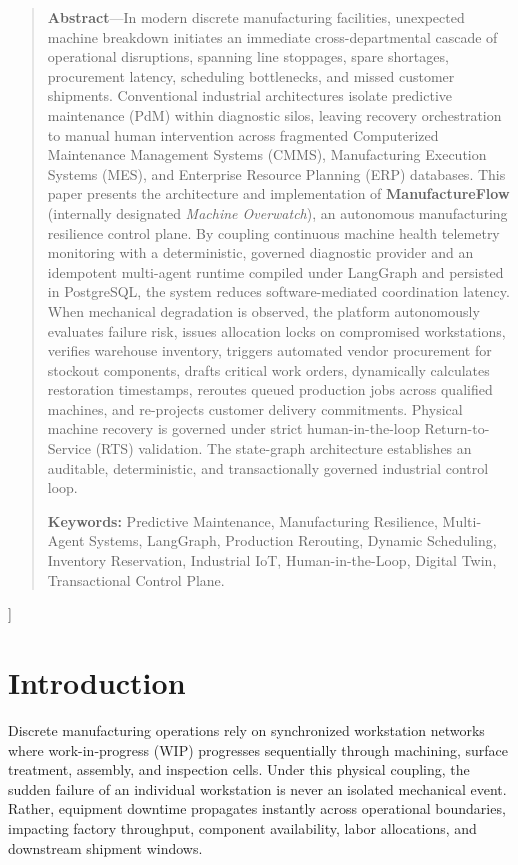 \documentclass[10pt,twocolumn,a4paper]{article}
\begin{document}
{\begin{quote}
  \small
  \textbf{Abstract}---In modern discrete manufacturing facilities, unexpected machine breakdown initiates an immediate cross-departmental cascade of operational disruptions, spanning line stoppages, spare shortages, procurement latency, scheduling bottlenecks, and missed customer shipments. Conventional industrial architectures isolate predictive maintenance (PdM) within diagnostic silos, leaving recovery orchestration to manual human intervention across fragmented Computerized Maintenance Management Systems (CMMS), Manufacturing Execution Systems (MES), and Enterprise Resource Planning (ERP) databases. This paper presents the architecture and implementation of \textbf{ManufactureFlow} (internally designated \textit{Machine Overwatch}), an autonomous manufacturing resilience control plane. By coupling continuous machine health telemetry monitoring with a deterministic, governed diagnostic provider and an idempotent multi-agent runtime compiled under LangGraph and persisted in PostgreSQL, the system reduces software-mediated coordination latency. When mechanical degradation is observed, the platform autonomously evaluates failure risk, issues allocation locks on compromised workstations, verifies warehouse inventory, triggers automated vendor procurement for stockout components, drafts critical work orders, dynamically calculates restoration timestamps, reroutes queued production jobs across qualified machines, and re-projects customer delivery commitments. Physical machine recovery is governed under strict human-in-the-loop Return-to-Service (RTS) validation. The state-graph architecture establishes an auditable, deterministic, and transactionally governed industrial control loop.
  \par\vspace{0.5em}
  \noindent\textbf{Keywords:} Predictive Maintenance, Manufacturing Resilience, Multi-Agent Systems, LangGraph, Production Rerouting, Dynamic Scheduling, Inventory Reservation, Industrial IoT, Human-in-the-Loop, Digital Twin, Transactional Control Plane.
\end{quote}
\vspace{1.2em}
}]

\section{Introduction}
\label{sec:introduction}
Discrete manufacturing operations rely on synchronized workstation networks where work-in-progress (WIP) progresses sequentially through machining, surface treatment, assembly, and inspection cells. Under this physical coupling, the sudden failure of an individual workstation is never an isolated mechanical event. Rather, equipment downtime propagates instantly across operational boundaries, impacting factory throughput, component availability, labor allocations, and downstream shipment windows.
\end{document}
